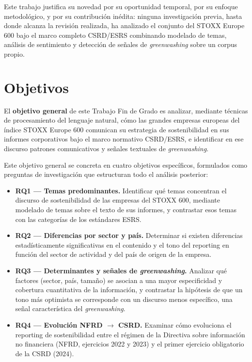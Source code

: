 \bigskip
Este trabajo justifica su novedad por su oportunidad temporal, por su enfoque metodológico,
y por su contribución inédita: ninguna investigación previa,
hasta donde alcanza la revisión realizada, ha analizado el conjunto del STOXX Europe 600 bajo
el marco completo CSRD/ESRS combinando modelado de temas, análisis de sentimiento y detección
de señales de \textit{greenwashing} sobre un corpus propio.

\section{Objetivos}
\label{sec:objetivos}

El \textbf{objetivo general} de este Trabajo Fin de Grado es analizar, mediante técnicas de
procesamiento del lenguaje natural, cómo las grandes empresas europeas del índice STOXX
Europe 600 comunican su estrategia de sostenibilidad en sus informes corporativos bajo el
marco normativo CSRD/ESRS, e identificar en ese discurso patrones comunicativos y señales
textuales de \textit{greenwashing}.

Este objetivo general se concreta en cuatro objetivos específicos, formulados como preguntas
de investigación que estructuran todo el análisis posterior:

\begin{itemize}
  \item \textbf{RQ1 — Temas predominantes.} Identificar qué temas concentran el
  discurso de sostenibilidad de las empresas del STOXX 600, mediante modelado de temas sobre
  el texto de sus informes, y contrastar esos temas con las categorías de los estándares
  ESRS.
  \item \textbf{RQ2 — Diferencias por sector y país.} Determinar si existen diferencias
  estadísticamente significativas en el contenido y el tono del reporting en función del
  sector de actividad y del país de origen de la empresa.
  \item \textbf{RQ3 — Determinantes y señales de \textit{greenwashing}.} Analizar qué
  factores (sector, país, tamaño) se asocian a una mayor especificidad y cobertura
  cuantitativa de la información, y contrastar la hipótesis de que un tono más optimista se
  corresponde con un discurso menos específico, una señal característica del
  \textit{greenwashing}.
  \item \textbf{RQ4 — Evolución NFRD $\rightarrow$ CSRD.} Examinar cómo evoluciona el
  reporting de sostenibilidad entre el régimen de la Directiva sobre información no financiera
  (NFRD, ejercicios 2022 y 2023) y el primer ejercicio obligatorio de la CSRD (2024).
\end{itemize}

